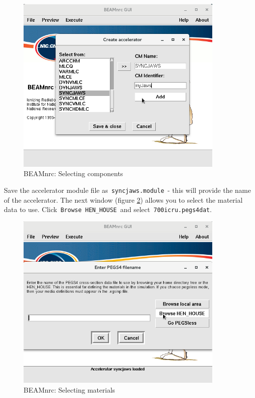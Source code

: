 \documentclass[12pt,twoside]{article}
\begin{document}
\begin{figure}
\begin{center}
\includegraphics[width=4in]{figures/beamnrc_specifyNew2}
\caption{BEAMnrc: Selecting components}
\label{fig:beamnrc_specifyNew2}
\end{center}
\end{figure}

Save the accelerator module file as \,\Verb|syncjaws.module|\, - this will provide the name of the accelerator. The next window (figure \ref{fig:beamnrc_specifyNew3}) allows you to select the material data to use. Click \,\Verb|Browse HEN_HOUSE|\, and select \,\Verb|700icru.pegs4dat|.

\begin{figure}
\begin{center}
\includegraphics[width=4in]{figures/beamnrc_specifyNew3}
\caption{BEAMnrc: Selecting materials}
\label{fig:beamnrc_specifyNew3}
\end{center}
\end{figure}
\end{document}
